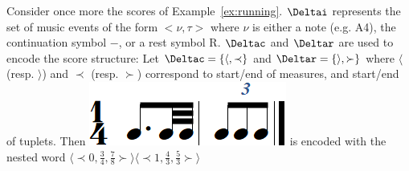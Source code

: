 \begin{example}\label{ex:nested-word}
Consider once more the scores of Example~\ref{ex:running}.
$\Deltai$ represents the set of music events of the form $<\nu, \tau>$
where $\nu$ is either a note (e.g. A4), the continuation symbol $-$, or a
rest symbol R. $\Deltac$ and  $\Deltar$ are used to encode the score structure:
Let $\Deltac = \{\langle, \prec\}$ and  $\Deltar = \{\rangle, \succ\}$ where $\langle$
(resp. $\rangle$)
and $\prec$ (resp. $\succ$) correspond to start/end of measures, and start/end of
tuplets. Then  \includegraphics[scale=0.20]{pictures/score5.png}
is encoded with the nested word $\langle \prec 0, \frac{3}{4}, \frac{7}{8} \succ \rangle \langle \prec 1, \frac{4}{3}, \frac{5}{3}  \succ \rangle$
\endex
\end{example}






